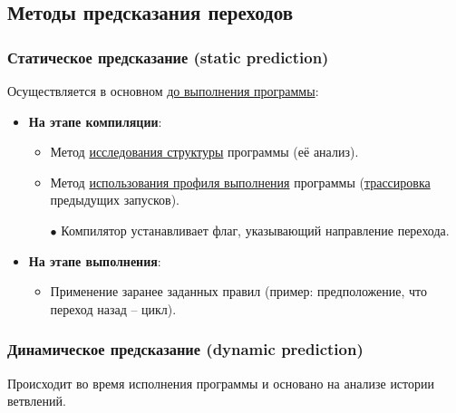 	\subsection{Методы предсказания переходов}
	
	\subsubsection{Статическое предсказание (static prediction)}
	
	Осуществляется в основном \uline{до выполнения программы}:
	
	\begin{itemize}[leftmargin=2.25em]
		\item \textbf{На этапе компиляции}:
		\begin{itemize}[leftmargin=1.35em]
			\item Метод \uline{исследования структуры} программы (её анализ).
			\item Метод \uline{использования профиля выполнения} программы (\uline{трассировка} предыдущих запусков).
			\par
			$\bullet$ Компилятор устанавливает флаг, указывающий направление перехода.
		\end{itemize}
		\item \textbf{На этапе выполнения}:
		\begin{itemize}[leftmargin=1.35em]
			\item Применение заранее заданных правил (пример: предположение, что переход назад -- цикл).
		\end{itemize}
	\end{itemize}
	
	\subsubsection{Динамическое предсказание (dynamic prediction)}
	
	Происходит во время исполнения программы и основано на анализе истории ветвлений.
	
